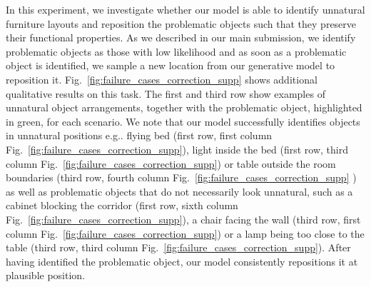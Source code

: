 \documentclass{article}
\makeatletter
\DeclareRobustCommand\onedot{\futurelet\@let@token\@onedot}
\def\@onedot{\ifx\@let@token.\else.\null\fi\xspace}
\def\eg{e.g\onedot} \def\Eg{E.g\onedot}
\newcommand{\figref}[1]{Fig.~\ref{#1}}
\makeatother
\begin{document}
In this experiment, we investigate whether our model is able to identify
unnatural furniture layouts and reposition the problematic objects such that
they preserve their functional properties. As we described in our main
submission, we identify problematic objects as those with low likelihood and as
soon as a problematic object is identified, we sample a new location from our
generative model to reposition it. \figref{fig:failure_cases_correction_supp}
shows additional qualitative results on this task. The first and third row show
examples of unnatural object arrangements, together with the problematic
object, highlighted in green, for each scenario. We note that our model
successfully identifies objects in unnatural positions \eg flying bed (first
row, first column \figref{fig:failure_cases_correction_supp}), light inside the
bed (first row, third column \figref{fig:failure_cases_correction_supp}) or table outside the room boundaries (third row,
fourth column \figref{fig:failure_cases_correction_supp} ) as well as problematic objects that do not necessarily look
unnatural, such as a cabinet blocking the corridor (first row, sixth column \figref{fig:failure_cases_correction_supp}), a
chair facing the wall (third row, first column \figref{fig:failure_cases_correction_supp}) or a lamp being too close to
the table (third row, third column \figref{fig:failure_cases_correction_supp}). After having identified the problematic
object, our model consistently repositions it at plausible position.
\end{document}
